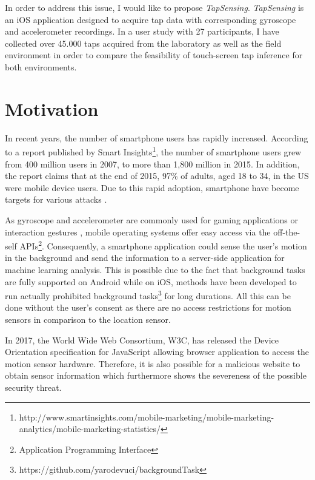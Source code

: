 In order to address this issue, I would like to propose \textit{TapSensing}. \textit{TapSensing} is an iOS application designed to acquire tap data with corresponding gyroscope and accelerometer recordings. In a user study with 27 participants, I have collected over 45.000 taps acquired from the laboratory as well as the field environment in order to compare the feasibility of touch-screen tap inference for both environments.

\section{Motivation}

In recent years, the number of smartphone users has rapidly
increased. According to a report published by Smart
Insights\footnote{http://www.smartinsights.com/mobile-marketing/mobile-marketing-analytics/mobile-marketing-statistics/}, the number of smartphone users grew from 400 million users in 2007, to more than 1,800 million in 2015. In addition, the report claims that at the end of 2015, 97\% of adults, aged 18 to 34, in the US were mobile device users. Due to this rapid adoption, smartphone have become targets for various attacks \cite{Colp:2015:PDS:2694344.2694380, Aviv:2010:SAS:1925004.1925009, Touchlogger}.

As gyroscope and accelerometer are commonly used for gaming applications\cite{feijoo2012mobile} or interaction gestures \cite{pylvanainen2005accelerometer}, mobile operating systems offer easy access via the off-the-self APIs\footnote{Application Programming Interface}. Consequently, a smartphone application could sense the user's motion in the background and send the information to a server-side application for machine learning analysis. This is possible due to the fact that background tasks are fully supported on Android while on iOS, methods have been developed to run actually prohibited background tasks\footnote{https://github.com/yarodevuci/backgroundTask} for long durations. All this can be done without the user's consent as there are no access restrictions for motion sensors in comparison to the location sensor.

In 2017, the World Wide Web Consortium, W3C, has released the Device Orientation specification \cite{w3c} for JavaScript allowing browser application to access the motion sensor hardware. Therefore, it is also possible for a malicious website to obtain sensor information which furthermore shows the severeness of the possible security threat.

